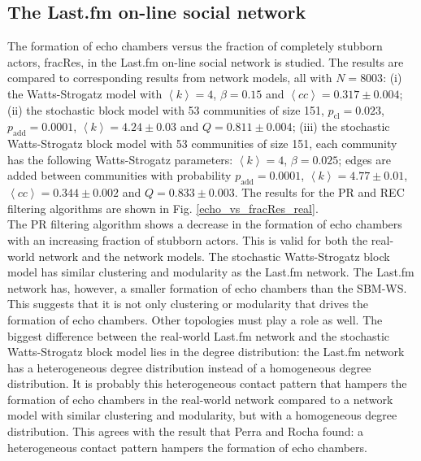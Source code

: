 \documentclass[11 pt , letterpaper , twoside , openright]{book}
\begin{document}
\subsection{The Last.fm on-line social network}

The formation of echo chambers versus the fraction of completely stubborn actors, fracRes, in the Last.fm on-line social network is studied. The results are compared to corresponding results from network models, all with $N = 8003$: (i) the Watts-Strogatz model with $\left<k\right> = 4$, $\beta = 0.15$ and $\left<cc\right> = 0.317 \pm 0.004$; (ii) the stochastic block model with 53 communities of size 151, $p_\text{cl} = 0.023$, $p_\text{add} = 0.0001$, $\left<k\right> = 4.24 \pm 0.03$ and $Q = 0.811 \pm 0.004$; (iii) the stochastic Watts-Strogatz block model with 53 communities of size 151, each community has the following Watts-Strogatz parameters: $\left<k\right> = 4$, $\beta = 0.025$; edges are added between communities with probability $p_\text{add} = 0.0001$, $\left<k\right> = 4.77 \pm 0.01$, $\left<cc\right> = 0.344 \pm 0.002$ and $Q = 0.833 \pm 0.003$. The results for the PR and REC filtering algorithms are shown in Fig. \ref{echo_vs_fracRes_real}.\\
\newline
The PR filtering algorithm shows a decrease in the formation of echo chambers with an increasing fraction of stubborn actors. This is valid for both the real-world network and the network models. The stochastic Watts-Strogatz block model has similar clustering and modularity as the Last.fm network. The Last.fm network has, however, a smaller formation of echo chambers than the SBM-WS. This suggests that it is not only clustering or modularity that drives the formation of echo chambers. Other topologies must play a role as well. The biggest difference between the real-world Last.fm network and the stochastic Watts-Strogatz block model lies in the degree distribution: the Last.fm network has a heterogeneous degree distribution instead of a homogeneous degree distribution. It is probably this heterogeneous contact pattern that hampers the formation of echo chambers in the real-world network compared to a network model with similar clustering and modularity, but with a homogeneous degree distribution. This agrees with the result that Perra and Rocha \cite{Perra2019} found: a heterogeneous contact pattern hampers the formation of echo chambers.\\
\newline 
\end{document}
